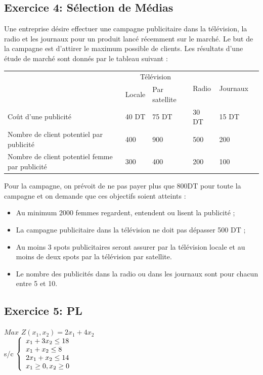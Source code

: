 \documentclass[]{book}
\begin{document}
\subsection*{Exercice 4: Sélection de Médias }
Une entreprise désire effectuer une campagne publicitaire dans la télévision, la radio et les journaux pour un produit lancé récemment sur le marché. Le but de la campagne est d’attirer le maximum possible de clients. Les résultats d’une étude de marché sont donnés par le tableau suivant :\\
\begin{center}
    \begin{tabular}{ |p{5cm}||p{2cm}|p{2cm}|p{2cm}|p{2cm}|p{2cm}| }
        \hline
        & \multicolumn{2}{c|}{Télévision} & \multirow{2}{*}{Radio} & \multirow{2}{*}{Journaux} \\ 
        \cline{2-3}
        & Locale & Par satellite &  &  \\ 
        \hline \hline
        Coût d'une publicité & 40 DT & 75 DT& 30 DT & 15 DT \\
        \hline
        Nombre de client potentiel par publicité & 400 & 900& 500 & 200 \\
        \hline
        Nombre de client potentiel femme par publicité & 300& 400 & 200 & 100 \\
        \hline
    \end{tabular}
\end{center}
Pour la campagne, on prévoit de ne pas payer plus que 800DT pour toute la campagne et on demande que ces objectifs soient atteints :
\begin{itemize}
    \item Au minimum 2000 femmes regardent, entendent ou lisent la publicité ;
    \item La campagne publicitaire dans la télévision ne doit pas dépasser 500 DT ;
    \item Au moins 3 spots publicitaires seront assurer par la télévision locale et au moins de deux spots par la télévision par satellite.
    \item Le nombre des publicités dans la radio ou dans les journaux sont pour chacun entre 5 et 10.
\end{itemize}

\subsection*{Exercice 5: PL}
    $Max$ $Z(x_1,x_2) = 2x_1 + 4x_2$\\
s/c $\left\{
	\begin{array}l
	x_1 + 3x_2 \leq 18\\
    x_1 + x_2 \leq 8\\
    2x_1 + x_2 \leq 14\\
	x_1 \geq 0, x_2 \geq 0\end{array}
	\right.$
\end{document}
